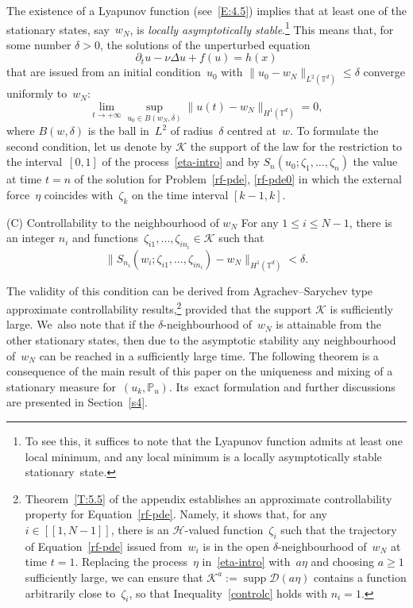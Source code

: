 \documentclass[JEP,XML,SOM,Unicode,ThmDefs]{cedram}
\let\mathcal\mathscr
\theoremstyle{plain}
\numberwithin{equation}{section}
\let\p\partial
\let\ty\infty
\newcommand{\IP}{{\mathbb P}}
\newcommand{\T}{{\mathbb T}}
\DeclareMathOperator{\supp}{supp}
\newcommand{\DD}{{\mathcal D}}
\newcommand{\HH}{{\mathcal H}}
\newcommand{\KK}{{\mathcal K}}
\begin{document}
The existence of a Lyapunov function (see~\eqref{E:4.5}) implies that at least one of the stationary states, say~$w_N$, is \emph{locally asymptotically stable}.\footnote{To see this, it suffices to note that the Lyapunov function admits at least one local minimum, and any local minimum is a locally asymptotically stable stationary~state.} This means that, for some number $\delta>0$, the solutions of the unperturbed equation
\begin{equation} \label{unperturbed-eq}
\p_t u-\nu\Delta u+f(u)=h(x)
\end{equation}
that are issued from an initial condition~$u_0$ with $\|u_0-w_N\|_{L^2(\T^d)} \le \delta$ converge uniformly to~$w_N$:
\begin{equation} \label{wNconvergence}
\lim_{t\to +\ty}\sup_{u_0\in B(w_N,\delta)}\|u(t)-w_N\|_{H^1(\T^d)}=0,
\end{equation}
where $B(w,\delta)$ is the ball in~$L^2$ of radius~$\delta$ centred at~$w$. To formulate the second condition, let us denote by $\KK$ the support of the law for the restriction to the interval~$[0,1]$ of the process~\eqref{eta-intro} and by $S_n(u_0;\zeta_1,\dots,\zeta_n)$ the value at time $t=n$ of the solution for Problem~\eqref{rf-pde}, \eqref{rf-pde0} in which the external force~$\eta$ coincides with~$\zeta_k$ on the time interval $[k-1,k]$.

\begin{enonce*}{\hypertarget{C}{(C)} Controllability to the neighbourhood of $w_N$}
For any $1\le i\le N-1$, there is an integer $n_i$ and functions~$\zeta_{i1},\dots,\zeta_{in_i}\in \KK$ such that \begin{equation}\label{controlc}
\|S_{n_i}(w_i;\zeta_{i1},\dots,\zeta_{in_i})-w_N\|_{H^1(\T^d)} < \delta.
\end{equation}
\end{enonce*}

The validity of this condition can be derived from Agrachev--Sarychev type approximate controllability results,\footnote{Theorem~\ref{T:5.5} of the appendix establishes an approximate controllability property for Equation~\eqref{rf-pde}. Namely, it shows that, for any $i\in[\![1,N-1]\!]$, there is an $\HH$-valued function~$\zeta_i$ such that the trajectory of Equation~\eqref{rf-pde} issued from~$w_i$ is in the open $\delta$-neighbourhood of~$w_N$ at time $t=1$. Replacing the process~$\eta$ in~\eqref{eta-intro} with~$a\eta$ and choosing $a\ge1$ sufficiently large, we can ensure that $\KK^a:=\supp \DD(a\eta)$ contains a function arbitrarily close to~$\zeta_i$, so that Inequality~\eqref{controlc} holds with $n_i=1$.} provided that the support $\KK$ is sufficiently large. We~also note that if the $\delta$-neighbourhood of~$w_N$ is attainable from the other stationary states, then due to the asymptotic stability any neighbourhood of~$w_N$ can be reached in a sufficiently large time. The following theorem is a consequence of the main result of this paper on the uniqueness and mixing of a stationary measure for~$(u_k,\IP_u)$. Its~exact formulation and further discussions are presented in Section~\ref{s4}.
\end{document}
